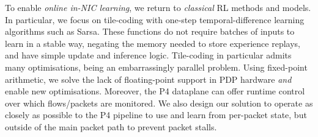 \documentclass[
sigconf,natbib=false
]{acmart}
\begin{document}




To enable \emph{online in-NIC learning}, we return to \emph{classical} RL methods and models.
In particular, we focus on tile-coding with one-step temporal-difference learning algorithms such as Sarsa.
These functions do not require batches of inputs to learn in a stable way, negating the memory needed to store experience replays, and have simple update and inference logic.
Tile-coding in particular admits many optimisations, being an embarrassingly parallel problem.
Using fixed-point arithmetic, we solve the lack of floating-point support in PDP hardware \emph{and} enable new optimisations.
Moreover, the P4 dataplane can offer runtime control over which flows/packets are monitored.
We also design our solution to operate as closely as possible to the P4 pipeline to use and learn from per-packet state, but outside of the main packet path to prevent packet stalls.

\end{document}

